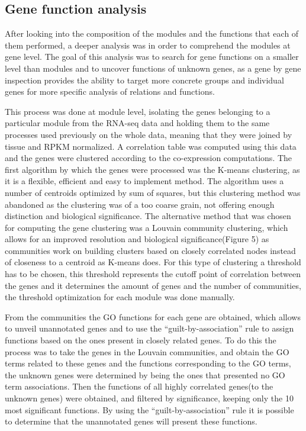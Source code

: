 \documentclass[
]{article}
\begin{document}
\hypertarget{gene-function-analysis}{%
\subsection{Gene function analysis}\label{gene-function-analysis}}

After looking into the composition of the modules and the functions that
each of them performed, a deeper analysis was in order to comprehend the
modules at gene level. The goal of this analysis was to search for gene
functions on a smaller level than modules and to uncover functions of
unknown genes, as a gene by gene inspection provides the ability to
target more concrete groups and individual genes for more specific
analysis of relations and functions.

This process was done at module level, isolating the genes belonging to
a particular module from the RNA-seq data and holding them to the same
processes used previously on the whole data, meaning that they were
joined by tissue and RPKM normalized. A correlation table was computed
using this data and the genes were clustered according to the
co-expression computations. The first algorithm by which the genes were
processed was the K-means clustering, as it is a flexible, efficient and
easy to implement method. The algorithm uses a number of centroids
optimized by sum of squares, but this clustering method was abandoned as
the clustering was of a too coarse grain, not offering enough
distinction and biological significance. The alternative method that was
chosen for computing the gene clustering was a Louvain community
clustering, which allows for an improved resolution and biological
significance(Figure 5) as communities work on building clusters based on
closely correlated nodes instead of closeness to a centroid as K-means
does. For this type of clustering a threshold has to be chosen, this
threshold represents the cutoff point of correlation between the genes
and it determines the amount of genes and the number of communities, the
threshold optimization for each module was done manually.

From the communities the GO functions for each gene are obtained, which
allows to unveil unannotated genes and to use the
``guilt-by-association'' rule to assign functions based on the ones
present in closely related genes. To do this the process was to take the
genes in the Louvain communities, and obtain the GO terms related to
these genes and the functions corresponding to the GO terms, the unknown
genes were determined by being the ones that presented no GO term
associations. Then the functions of all highly correlated genes(to the
unknown genes) were obtained, and filtered by significance, keeping only
the 10 most significant functions. By using the ``guilt-by-association''
rule it is possible to determine that the unannotated genes will present
these functions.
\end{document}
